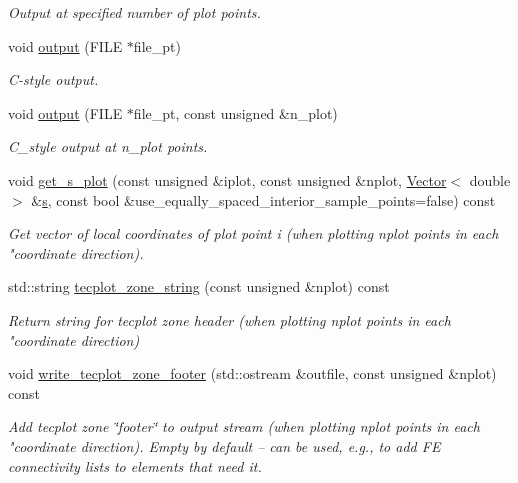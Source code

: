 \begin{DoxyCompactItemize}
\begin{DoxyCompactList}\small\item\em Output at specified number of plot points. \end{DoxyCompactList}\item 
void \hyperlink{classoomph_1_1TElement_3_013_00_01NNODE__1D_01_4_aed56950c0e732fd82642e02de3ada47b}{output} (F\+I\+LE $\ast$file\+\_\+pt)
\begin{DoxyCompactList}\small\item\em C-\/style output. \end{DoxyCompactList}\item 
void \hyperlink{classoomph_1_1TElement_3_013_00_01NNODE__1D_01_4_a4f18cb8f2a3a26dc086a84b7752870da}{output} (F\+I\+LE $\ast$file\+\_\+pt, const unsigned \&n\+\_\+plot)
\begin{DoxyCompactList}\small\item\em C\+\_\+style output at n\+\_\+plot points. \end{DoxyCompactList}\item 
void \hyperlink{classoomph_1_1TElement_3_013_00_01NNODE__1D_01_4_af2cefb5ff09aa773e5ddad809b6eb485}{get\+\_\+s\+\_\+plot} (const unsigned \&iplot, const unsigned \&nplot, \hyperlink{classoomph_1_1Vector}{Vector}$<$ double $>$ \&\hyperlink{cfortran_8h_ab7123126e4885ef647dd9c6e3807a21c}{s}, const bool \&use\+\_\+equally\+\_\+spaced\+\_\+interior\+\_\+sample\+\_\+points=false) const
\begin{DoxyCompactList}\small\item\em Get vector of local coordinates of plot point i (when plotting nplot points in each "coordinate direction). \end{DoxyCompactList}\item 
std\+::string \hyperlink{classoomph_1_1TElement_3_013_00_01NNODE__1D_01_4_a857b239f0a79b18542749ee94e441c88}{tecplot\+\_\+zone\+\_\+string} (const unsigned \&nplot) const
\begin{DoxyCompactList}\small\item\em Return string for tecplot zone header (when plotting nplot points in each "coordinate direction) \end{DoxyCompactList}\item 
void \hyperlink{classoomph_1_1TElement_3_013_00_01NNODE__1D_01_4_a4f5aece48d3f6a77c494b3aa42b5cc7a}{write\+\_\+tecplot\+\_\+zone\+\_\+footer} (std\+::ostream \&outfile, const unsigned \&nplot) const
\begin{DoxyCompactList}\small\item\em Add tecplot zone \char`\"{}footer\char`\"{} to output stream (when plotting nplot points in each "coordinate direction). Empty by default -- can be used, e.\+g., to add FE connectivity lists to elements that need it. \end{DoxyCompactList}\item 

\end{DoxyCompactItemize}
